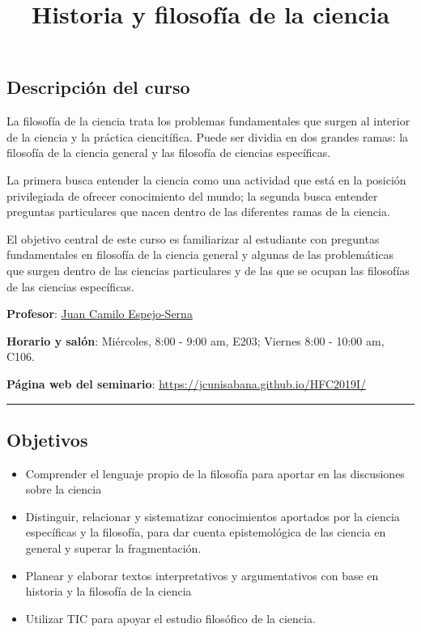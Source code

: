 \documentclass[spanish,]{article}
\title{Historia y filosofía de la ciencia}
\author{}
\date{}
\begin{document}
\maketitle

\subsection{Descripción del curso}\label{descripcion-del-curso}

La filosofía de la ciencia trata los problemas fundamentales que surgen
al interior de la ciencia y la práctica ciencitífica. Puede ser dividia
en dos grandes ramas: la filosofía de la ciencia general y las filosofía
de ciencias específicas.

La primera busca entender la ciencia como una actividad que está en la
posición privilegiada de ofrecer conocimiento del mundo; la segunda
busca entender preguntas particulares que nacen dentro de las diferentes
ramas de la ciencia.

El objetivo central de este curso es familiarizar al estudiante con
preguntas fundamentales en filosofía de la ciencia general y algunas de
las problemáticas que surgen dentro de las ciencias particulares y de
las que se ocupan las filosofías de las ciencias específicas.

\textbf{Profesor}: \href{../index.html}{Juan Camilo Espejo-Serna}~

\textbf{Horario y salón}: Miércoles, 8:00 - 9:00 am, E203; Viernes 8:00
- 10:00 am, C106.

\textbf{Página web del seminario}:
\url{https://jcunisabana.github.io/HFC2019I/}

\begin{center}\rule{0.5\linewidth}{\linethickness}\end{center}

\subsection{Objetivos}\label{objetivos}

\begin{itemize}
\item
  Comprender el lenguaje propio de la filosofía para aportar en las
  discusiones sobre la ciencia
\item
  Distinguir, relacionar y sistematizar conocimientos aportados por la
  ciencia específicas y la filosofía, para dar cuenta epistemológica de
  las ciencia en general y superar la fragmentación.
\item
  Planear y elaborar textos interpretativos y argumentativos con base en
  historia y la filosofía de la ciencia
\item
  Utilizar TIC para apoyar el estudio filosófico de la ciencia.
\end{itemize}
\end{document}
